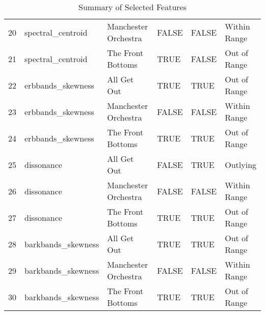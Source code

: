\documentclass{article}\usepackage[]{graphicx}\usepackage[]{xcolor}
\begin{document}
\begin{table}[ht]
\begin{tabular}{rlllll}
  20 & spectral\_centroid & Manchester Orchestra & FALSE & FALSE & Within Range \\ 
  21 & spectral\_centroid & The Front Bottoms & TRUE & FALSE & Out of Range \\ 
  22 & erbbands\_skewness & All Get Out & TRUE & TRUE & Out of Range \\ 
  23 & erbbands\_skewness & Manchester Orchestra & FALSE & FALSE & Within Range \\ 
  24 & erbbands\_skewness & The Front Bottoms & TRUE & TRUE & Out of Range \\ 
  25 & dissonance & All Get Out & FALSE & TRUE & Outlying \\ 
  26 & dissonance & Manchester Orchestra & FALSE & FALSE & Within Range \\ 
  27 & dissonance & The Front Bottoms & TRUE & TRUE & Out of Range \\ 
  28 & barkbands\_skewness & All Get Out & TRUE & TRUE & Out of Range \\ 
  29 & barkbands\_skewness & Manchester Orchestra & FALSE & FALSE & Within Range \\ 
  30 & barkbands\_skewness & The Front Bottoms & TRUE & TRUE & Out of Range \\ 
   \hline
\end{tabular}
\endgroup
\caption{Summary of Selected Features} 
\end{table}
\end{document}

